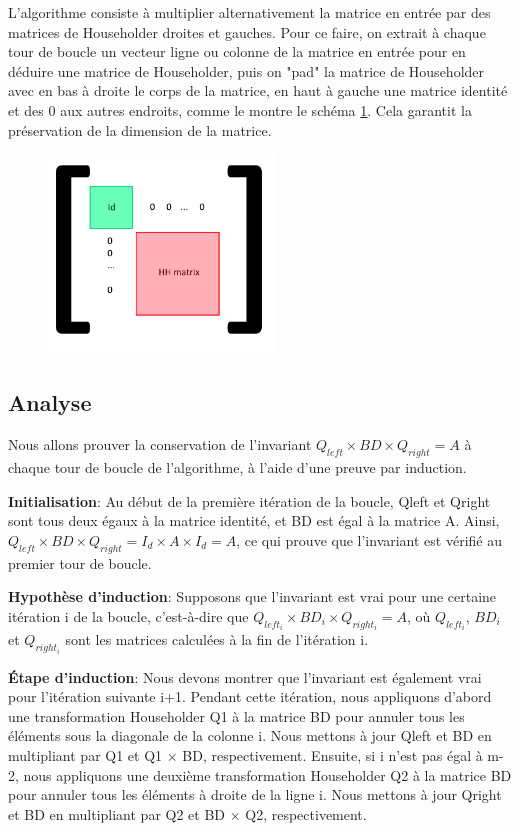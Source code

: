 \documentclass{article}
\begin{document}
L'algorithme consiste à multiplier alternativement la matrice en entrée par des matrices de Householder droites et gauches.
Pour ce faire, on extrait à chaque tour de boucle un vecteur ligne ou colonne de la matrice en entrée pour en déduire une matrice de Householder,
puis on "pad" la matrice de Householder avec en bas à droite le corps de la matrice, en haut à gauche une matrice identité et des 0 aux autres endroits,
comme le montre le schéma \ref{img:pad_HH}.
Cela garantit la préservation de la dimension de la matrice.

\begin{figure}[!htb]
  \caption[]{}
  \label{img:pad_HH}
  \centering
  \includegraphics[width=6cm]{../files/hh_padded.png}
\end{figure}

\subsection{Analyse}
\label{ssec:analyse_bidiag}

Nous allons prouver la conservation de l'invariant $Q_{left} \times BD \times Q_{right} = A$ 
à chaque tour de boucle de l'algorithme, à l'aide d'une preuve par induction.

\textbf{Initialisation}: Au début de la première itération de la boucle, 
Qleft et Qright sont tous deux égaux à la matrice identité, et BD est égal à la matrice A. 
Ainsi, $Q_{left} \times BD \times Q_{right} = I_d \times A \times I_d = A$, 
ce qui prouve que l'invariant est vérifié au premier tour de boucle.

\textbf{Hypothèse d'induction}: Supposons que l'invariant est vrai pour une certaine itération i de la boucle,
c'est-à-dire que $Q_{left_i} \times BD_i \times Q_{right_i} = A$, où $Q_{left_i}$, $BD_i$ et $Q_{right_i}$
sont les matrices calculées à la fin de l'itération i.

\textbf{Étape d'induction}: Nous devons montrer que l'invariant est également vrai pour l'itération suivante i+1. 
Pendant cette itération, nous appliquons d'abord une transformation Householder Q1 à la matrice BD pour annuler 
tous les éléments sous la diagonale de la colonne i. Nous mettons à jour Qleft et BD en multipliant par Q1 et Q1 $\times$ BD, respectivement. 
Ensuite, si i n'est pas égal à m-2, nous appliquons une deuxième transformation Householder Q2 à la matrice BD 
pour annuler tous les éléments à droite de la ligne i. Nous mettons à jour Qright et BD en multipliant par Q2 et BD $\times$ Q2, respectivement.
\end{document}
